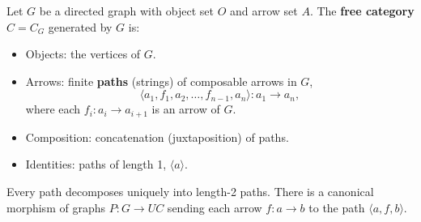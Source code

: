 Let $G$ be a directed graph with object set $O$ and arrow set $A$. The \textbf{free category} $C = C_G$ generated by $G$ is:
\begin{itemize}
\item Objects: the vertices of $G$.
\item Arrows: finite \textbf{paths} (strings) of composable arrows in $G$,
$$\langle a_1, f_1, a_2, \ldots, f_{n-1}, a_n \rangle: a_1 \to a_n,$$
where each $f_i: a_i \to a_{i+1}$ is an arrow of $G$.
\item Composition: concatenation (juxtaposition) of paths.
\item Identities: paths of length 1, $\langle a \rangle$.
\end{itemize}
Every path decomposes uniquely into length-2 paths. There is a canonical morphism of graphs $P: G \to UC$ sending each arrow $f: a \to b$ to the path $\langle a, f, b \rangle$.
